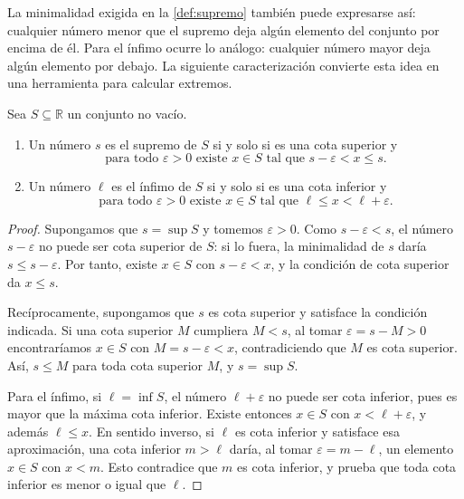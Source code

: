 La minimalidad exigida en la \cref{def:supremo} también puede expresarse así: cualquier número menor que el supremo deja algún elemento del conjunto por encima de él. Para el ínfimo ocurre lo análogo: cualquier número mayor deja algún elemento por debajo. La siguiente caracterización convierte esta idea en una herramienta para calcular extremos.

\begin{samepage}
\begin{proposition}
\label{prop:caracterizacion-extremos-epsilon}
Sea $S\subseteq\mathbb{R}$ un conjunto no vacío.
\begin{enumerate}
    \item Un número $s$ es el supremo de $S$ si y solo si es una cota superior y
    \[
     \text{para todo }\varepsilon>0\text{ existe }x\in S
     \text{ tal que }s-\varepsilon<x\leq s.
    \]
    \item Un número $\ell$ es el ínfimo de $S$ si y solo si es una cota inferior y
    \[
     \text{para todo }\varepsilon>0\text{ existe }x\in S
     \text{ tal que }\ell\leq x<\ell+\varepsilon.
    \]
\end{enumerate}
\end{proposition}
\end{samepage}

\begin{proof}
Supongamos que $s=\sup S$ y tomemos $\varepsilon>0$. Como $s-\varepsilon<s$, el número $s-\varepsilon$ no puede ser cota superior de $S$: si lo fuera, la minimalidad de $s$ daría $s\leq s-\varepsilon$. Por tanto, existe $x\in S$ con $s-\varepsilon<x$, y la condición de cota superior da $x\leq s$.

Recíprocamente, supongamos que $s$ es cota superior y satisface la condición indicada. Si una cota superior $M$ cumpliera $M<s$, al tomar $\varepsilon=s-M>0$ encontraríamos $x\in S$ con $M=s-\varepsilon<x$, contradiciendo que $M$ es cota superior. Así, $s\leq M$ para toda cota superior $M$, y $s=\sup S$.

Para el ínfimo, si $\ell=\inf S$, el número $\ell+\varepsilon$ no puede ser cota inferior, pues es mayor que la máxima cota inferior. Existe entonces $x\in S$ con $x<\ell+\varepsilon$, y además $\ell\leq x$. En sentido inverso, si $\ell$ es cota inferior y satisface esa aproximación, una cota inferior $m>\ell$ daría, al tomar $\varepsilon=m-\ell$, un elemento $x\in S$ con $x<m$. Esto contradice que $m$ es cota inferior, y prueba que toda cota inferior es menor o igual que $\ell$.
\end{proof}

